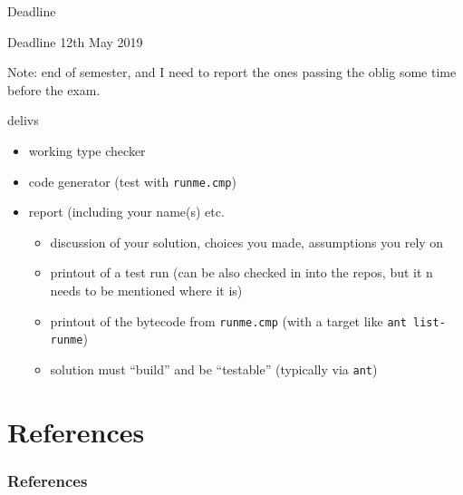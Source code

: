 \documentclass{beamer}
\begin{document}
\begin{frame}[label={sec:org3fd1dd9},fragile]{Deadline}
 \begin{alertblock}{Deadline}
12th May  2019
\end{alertblock}



Note: end of semester, and I need to report the ones passing the oblig some
time before the exam.


\begin{block}{delivs}
\begin{itemize}
\item working type checker
\item code generator (test with \texttt{runme.cmp})
\item report (including your name(s) etc.

\begin{itemize}
\item discussion of your solution, choices you made, assumptions you rely on

\item printout of a test run (can be also checked in into the repos, but it n
needs to be mentioned where it is)
\item printout of the bytecode from \texttt{runme.cmp} (with a target like \texttt{ant
    list-runme})

\item solution must ``build'' and be ``testable'' (typically via \texttt{ant})
\end{itemize}
\end{itemize}
\end{block}
\end{frame}



\section{References}
\label{sec:org26b3d9c}

\begin{frame}[allowframebreaks]
  \frametitle{References}
  {\tiny
    
%     
  }
\end{frame}




\end{document}
